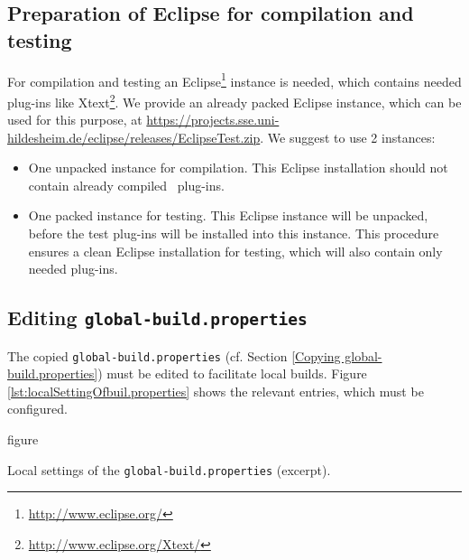 \subsection{Preparation of Eclipse for compilation and testing}
\label{sec:Preparation of Eclipse}
For compilation and testing an Eclipse\footnote{\url{http://www.eclipse.org/}} instance is needed, which contains needed plug-ins like Xtext\footnote{\url{http://www.eclipse.org/Xtext/}}. We provide an already packed Eclipse instance, which can be used for this purpose, at \url{https://projects.sse.uni-hildesheim.de/eclipse/releases/EclipseTest.zip}. We suggest to use 2 instances:
\begin{itemize}
	\item One unpacked instance for compilation. This Eclipse installation should not contain already compiled \EASy\ plug-ins.
	\item One packed instance for testing. This Eclipse instance will be unpacked, before the test plug-ins will be installed into this instance. This procedure ensures a clean Eclipse installation for testing, which will also contain only needed \EASy plug-ins.
\end{itemize}

\subsection{Editing \texttt{global-build.properties}}
\label{sec:global-build.properties}
The copied \texttt{global-build.properties} (cf. Section \vref{Copying global-build.properties}) must be edited to facilitate local builds. Figure \vref{lst:localSettingOfbuil.properties} shows the relevant entries, which must be configured.

\begin{nofloat}{figure}
	\centering
	
	\caption[Local settings of the \texttt{global-build.properties}]{Local settings of the \texttt{global-build.properties} (excerpt).}
	\label{lst:localSettingOfbuil.properties}
\end{nofloat}

